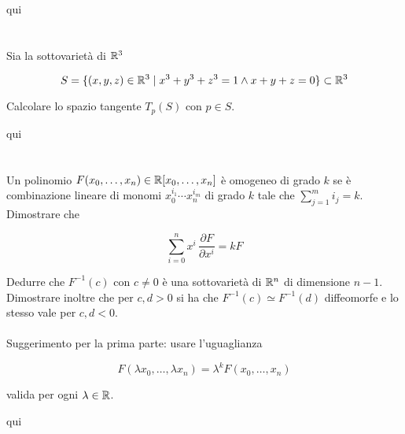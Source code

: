 qui

\tocless\section{}\label{BONUS2-3}

\begin{tcolorbox}
	Sia la sottovarietà di $ \mathbb{R}^{3} $
	
	\begin{equation}
		S = \{ (x,y,z) \in \mathbb{R}^{3} \mid x^{3} + y^{3} + z^{3} = 1 \wedge x+y+z=0 \} \subset \mathbb{R}^{3}
	\end{equation}
	
	Calcolare lo spazio tangente $ T_{p}(S) $ con $ p \in S $.
\end{tcolorbox}

qui

\tocless\section{}\label{es2-15}

\begin{tcolorbox}
	Un polinomio $ F(x_{0},\dots,x_{n}) \in \mathbb{R}[x_{0},\dots,x_{n}] $ è omogeneo di grado $ k $ se è combinazione lineare di monomi $ x_{0}^{i_{1}} \cdots x_{n}^{i_{m}} $ di grado $ k $ tale che $ \sum_{j=1}^{m} i_{j} = k $. Dimostrare che
	
	\begin{equation}
		\sum_{i=0}^{n} x^{i} \, \dfrac{\partial F}{\partial x^{i}} = k F
	\end{equation}

	Dedurre che $ F^{-1}(c) $ con $ c \neq 0 $ è una sottovarietà di $ \mathbb{R}^{n} $ di dimensione $ n-1 $. Dimostrare inoltre che per $ c,d>0 $ si ha che $ F^{-1}(c) \simeq F^{-1}(d) $ diffeomorfe e lo stesso vale per $ c,d<0 $.\\\\
	Suggerimento per la prima parte: usare l'uguaglianza
	
	\begin{equation}
		F(\lambda x_{0},\dots,\lambda x_{n}) = \lambda^{k} F(x_{0},\dots,x_{n})
	\end{equation}
	
	valida per ogni $ \lambda \in \mathbb{R} $.
\end{tcolorbox}

qui

\tocless\section{}\label{es2-16}

